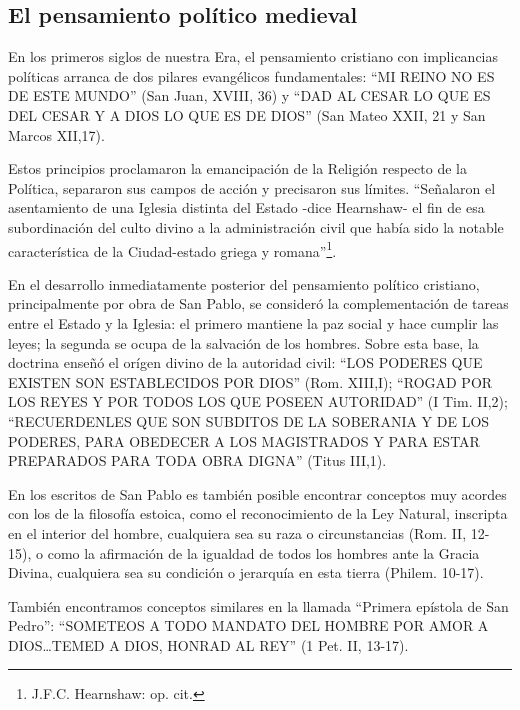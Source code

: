 \documentclass[
]{book}
\begin{document}
\hypertarget{el-pensamiento-poluxedtico-medieval}{%
\subsection*{El pensamiento político medieval}\label{el-pensamiento-poluxedtico-medieval}}

En los primeros siglos de nuestra Era, el pensamiento cristiano con implicancias políticas arranca de dos pilares evangélicos fundamentales: ``MI REINO NO ES DE ESTE MUNDO'' (San Juan, XVIII, 36) y ``DAD AL CESAR LO QUE ES DEL CESAR Y A DIOS LO QUE ES DE DIOS'' (San Mateo XXII, 21 y San Marcos XII,17).

Estos principios proclamaron la emancipación de la Religión respecto de la Política, separaron sus campos de acción y precisaron sus límites. ``Señalaron el asentamiento de una Iglesia distinta del Estado -dice Hearnshaw- el fin de esa subordinación del culto divino a la administración civil que había sido la notable característica de la Ciudad-estado griega y romana''\footnote{J.F.C. Hearnshaw: op. cit.}.

En el desarrollo inmediatamente posterior del pensamiento político cristiano, principalmente por obra de San Pablo, se consideró la complementación de tareas entre el Estado y la Iglesia: el primero mantiene la paz social y hace cumplir las leyes; la segunda se ocupa de la salvación de los hombres. Sobre esta base, la doctrina enseñó el orígen divino de la autoridad civil: ``LOS PODERES QUE EXISTEN SON ESTABLECIDOS POR DIOS'' (Rom. XIII,I); ``ROGAD POR LOS REYES Y POR TODOS LOS QUE POSEEN AUTORIDAD'' (I Tim. II,2); ``RECUERDENLES QUE SON SUBDITOS DE LA SOBERANIA Y DE LOS PODERES, PARA OBEDECER A LOS MAGISTRADOS Y PARA ESTAR PREPARADOS PARA TODA OBRA DIGNA'' (Titus III,1).

En los escritos de San Pablo es también posible encontrar conceptos muy acordes con los de la filosofía estoica, como el reconocimiento de la Ley Natural, inscripta en el interior del hombre, cualquiera sea su raza o circunstancias (Rom. II, 12-15), o como la afirmación de la igualdad de todos los hombres ante la Gracia Divina, cualquiera sea su condición o jerarquía en esta tierra (Philem. 10-17).

También encontramos conceptos similares en la llamada ``Primera epístola de San Pedro'': ``SOMETEOS A TODO MANDATO DEL HOMBRE POR AMOR A DIOS\ldots TEMED A DIOS, HONRAD AL REY'' (1 Pet. II, 13-17).
\end{document}
